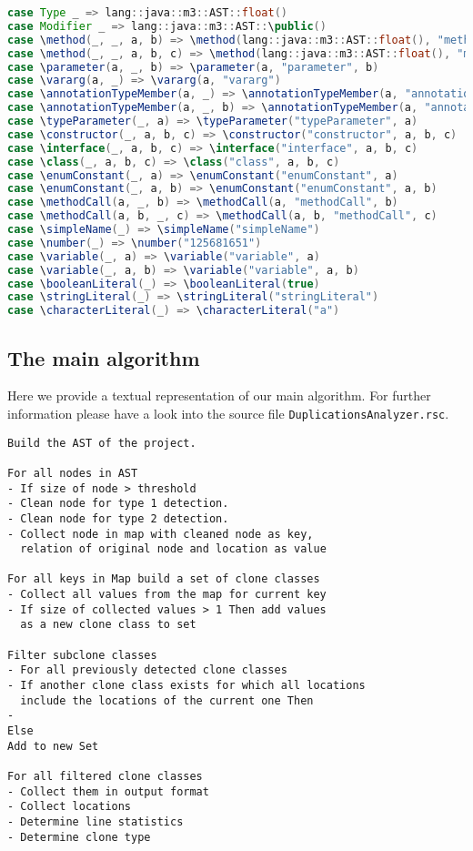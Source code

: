 \documentclass{uva-inf-article}
\begin{document}
\begin{lstlisting}[language=Java, style=mystyle]
case Type _ => lang::java::m3::AST::float()
case Modifier _ => lang::java::m3::AST::\public()
case \method(_, _, a, b) => \method(lang::java::m3::AST::float(), "method", a, b)
case \method(_, _, a, b, c) => \method(lang::java::m3::AST::float(), "method", a, b, c)
case \parameter(a, _, b) => \parameter(a, "parameter", b)
case \vararg(a, _) => \vararg(a, "vararg") 
case \annotationTypeMember(a, _) => \annotationTypeMember(a, "annotationTypeMember")
case \annotationTypeMember(a, _, b) => \annotationTypeMember(a, "annotationTypeMember", b)
case \typeParameter(_, a) => \typeParameter("typeParameter", a)
case \constructor(_, a, b, c) => \constructor("constructor", a, b, c)
case \interface(_, a, b, c) => \interface("interface", a, b, c)
case \class(_, a, b, c) => \class("class", a, b, c)
case \enumConstant(_, a) => \enumConstant("enumConstant", a) 
case \enumConstant(_, a, b) => \enumConstant("enumConstant", a, b)
case \methodCall(a, _, b) => \methodCall(a, "methodCall", b)
case \methodCall(a, b, _, c) => \methodCall(a, b, "methodCall", c)
case \simpleName(_) => \simpleName("simpleName")
case \number(_) => \number("125681651")
case \variable(_, a) => \variable("variable", a) 
case \variable(_, a, b) => \variable("variable", a, b) 
case \booleanLiteral(_) => \booleanLiteral(true)
case \stringLiteral(_) => \stringLiteral("stringLiteral")
case \characterLiteral(_) => \characterLiteral("a")
\end{lstlisting}

\subsection{The main algorithm}

Here we provide a textual representation of our main algorithm. For further information please have a look into the source file \texttt{DuplicationsAnalyzer.rsc}.

\begin{lstlisting}
Build the AST of the project.

For all nodes in AST 
- If size of node > threshold
- Clean node for type 1 detection.
- Clean node for type 2 detection.
- Collect node in map with cleaned node as key, 
  relation of original node and location as value

For all keys in Map build a set of clone classes
- Collect all values from the map for current key
- If size of collected values > 1 Then add values 
  as a new clone class to set

Filter subclone classes
- For all previously detected clone classes
- If another clone class exists for which all locations 
  include the locations of the current one Then
-
Else
Add to new Set

For all filtered clone classes
- Collect them in output format
- Collect locations
- Determine line statistics
- Determine clone type

\end{lstlisting}
\end{document}
